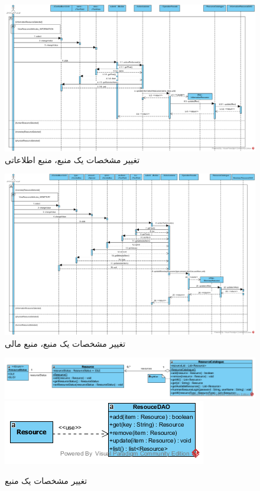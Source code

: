 \begin{landscape}
\begin{figure}[H]
	\centering
	\includegraphics[scale=0.6]{img/sequence-design/EditResourceAttributes_INFORMATION}
	\caption{تغییر مشخصات یک منبع، منبع اطلاعاتی}
\end{figure}
\begin{figure}[H]
	\centering
	\includegraphics[scale=0.6]{img/sequence-design/EditResourceAttributes_MONETARY}
	\caption{تغییر مشخصات یک منبع، منبع مالی}
\end{figure}

\begin{figure}[H]
	\centering
	\includegraphics[scale=0.7]{img/sequence-design/EditResourceAttributesC}
	\includegraphics[scale=0.7]{img/sequence-design/EditResourceAttributesD}
	\caption{تغییر مشخصات یک منبع}
\end{figure}


\end{landscape}
